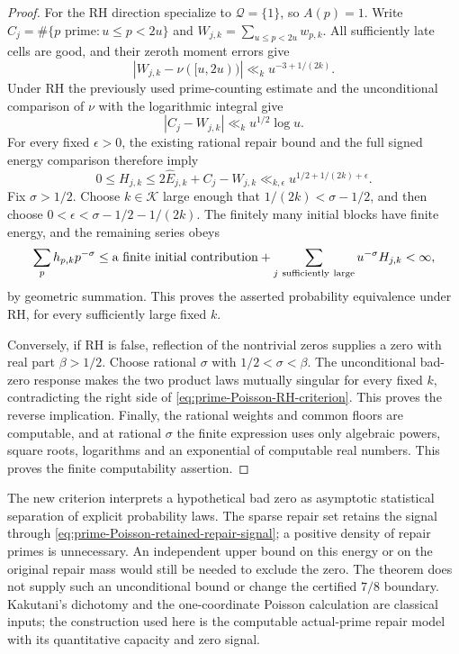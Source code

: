 \documentclass[11pt]{article}
\theoremstyle{definition}
\begin{document}
\begin{proof}
For the RH direction specialize to $\mathcal Q=\{1\}$,
so $A(p)=1$. Write
$C_j=\#\{p\text{ prime}:u\le p<2u\}$ and
$W_{j,k}=\sum_{u\le p<2u}w_{p,k}$.
All sufficiently late cells are good, and their zeroth
moment errors give
\[
 |W_{j,k}-\nu([u,2u))|
          \ll_k u^{-3+1/(2k)}.
\]
Under RH the previously used prime-counting estimate and
the unconditional comparison of $\nu$ with the logarithmic
integral give
\[
 |C_j-W_{j,k}|\ll_k u^{1/2}\log u.
\]
For every fixed $\epsilon>0$, the existing rational repair
bound and the full signed energy comparison therefore imply
\begin{equation}
 0\le H_{j,k}
       \le2\widehat E_{j,k}+C_j-W_{j,k}
       \ll_{k,\epsilon}u^{1/2+1/(2k)+\epsilon}.
 \label{eq:prime-Poisson-RH-energy-bound}
\end{equation}
Fix $\sigma>1/2$. Choose $k\in\mathcal K$ large enough
that $1/(2k)<\sigma-1/2$, and then choose
$0<\epsilon<\sigma-1/2-1/(2k)$. The finitely many initial
blocks have finite energy, and the remaining series obeys
\[
 \sum_p h_{p,k}p^{-\sigma}
       \le\text{a finite initial contribution}
          +\sum_{j\ {\rm sufficiently\ large}}u^{-\sigma}H_{j,k}
       <\infty,
\]
by geometric summation. This proves the asserted probability
equivalence under RH, for every sufficiently large fixed $k$.

Conversely, if RH is false, reflection of the nontrivial
zeros supplies a zero with real part $\beta>1/2$.
Choose rational $\sigma$ with $1/2<\sigma<\beta$.
The unconditional bad-zero response makes the two product
laws mutually singular for every fixed $k$, contradicting
the right side of \eqref{eq:prime-Poisson-RH-criterion}.
This proves the reverse implication.
Finally, the rational weights and common floors are computable,
and at rational $\sigma$ the finite expression uses only
algebraic powers, square roots, logarithms and an exponential
of computable real numbers. This proves the finite
computability assertion.
\end{proof}

The new criterion interprets a hypothetical bad zero as
asymptotic statistical separation of explicit probability
laws. The sparse repair set retains the signal through
\eqref{eq:prime-Poisson-retained-repair-signal}; a positive
density of repair primes is unnecessary. An independent
upper bound on this energy or on the original repair mass
would still be needed to exclude the zero. The theorem
does not supply such an unconditional bound or change
the certified $7/8$ boundary. Kakutani's dichotomy and the
one-coordinate Poisson calculation are classical inputs;
the construction used here is the computable actual-prime
repair model with its quantitative capacity and zero signal.
\end{document}
